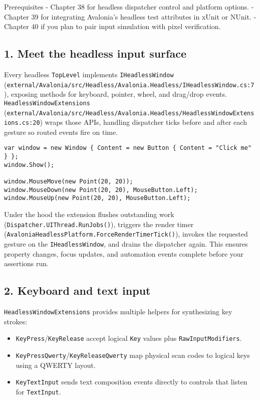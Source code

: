 Prerequisites - Chapter 38 for headless dispatcher control and platform
options. - Chapter 39 for integrating Avalonia's headless test
attributes in xUnit or NUnit. - Chapter 40 if you plan to pair input
simulation with pixel verification.

\subsection{1. Meet the headless input
surface}\label{meet-the-headless-input-surface}

Every headless \passthrough{\lstinline!TopLevel!} implements
\passthrough{\lstinline!IHeadlessWindow!}
(\passthrough{\lstinline!external/Avalonia/src/Headless/Avalonia.Headless/IHeadlessWindow.cs:7!}),
exposing methods for keyboard, pointer, wheel, and drag/drop events.
\passthrough{\lstinline!HeadlessWindowExtensions!}
(\passthrough{\lstinline!external/Avalonia/src/Headless/Avalonia.Headless/HeadlessWindowExtensions.cs:20!})
wraps those APIs, handling dispatcher ticks before and after each
gesture so routed events fire on time.

\begin{lstlisting}
var window = new Window { Content = new Button { Content = "Click me" } };
window.Show();

window.MouseMove(new Point(20, 20));
window.MouseDown(new Point(20, 20), MouseButton.Left);
window.MouseUp(new Point(20, 20), MouseButton.Left);
\end{lstlisting}

Under the hood the extension flushes outstanding work
(\passthrough{\lstinline!Dispatcher.UIThread.RunJobs()!}), triggers the
render timer
(\passthrough{\lstinline!AvaloniaHeadlessPlatform.ForceRenderTimerTick()!}),
invokes the requested gesture on the
\passthrough{\lstinline!IHeadlessWindow!}, and drains the dispatcher
again. This ensures property changes, focus updates, and automation
events complete before your assertions run.

\subsection{2. Keyboard and text input}\label{keyboard-and-text-input}

\passthrough{\lstinline!HeadlessWindowExtensions!} provides multiple
helpers for synthesizing key strokes:

\begin{itemize}
\tightlist
\item
  \passthrough{\lstinline!KeyPress!}/\passthrough{\lstinline!KeyRelease!}
  accept logical \passthrough{\lstinline!Key!} values plus
  \passthrough{\lstinline!RawInputModifiers!}.
\item
  \passthrough{\lstinline!KeyPressQwerty!}/\passthrough{\lstinline!KeyReleaseQwerty!}
  map physical scan codes to logical keys using a QWERTY layout.
\item
  \passthrough{\lstinline!KeyTextInput!} sends text composition events
  directly to controls that listen for
  \passthrough{\lstinline!TextInput!}.
\end{itemize}

